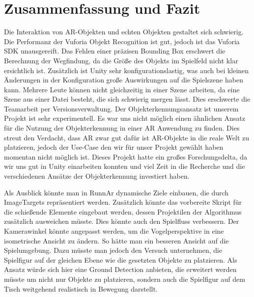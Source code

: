\chapter{Zusammenfassung und Fazit}

Die Interaktion von AR-Objekten und echten Objekten gestaltet sich schwierig. Die Performanz der Vuforia Objekt Recognition ist gut, jedoch ist das Vuforia SDK unausgereift. Das Fehlen einer präzisen Bounding Box erschwert die Berechnung der Wegfindung, da die Größe des Objekts im Spielfeld nicht klar ersichtlich ist. Zusätzlich ist Unity sehr konfigurationslastig, was auch bei kleinen Änderungen in der Konfiguration große Auswirkungen auf die Spielszene haben kann.  Mehrere Leute können nicht gleichzeitig in einer Szene arbeiten, da eine Szene aus einer Datei besteht, die sich schwierig mergen lässt. Dies erschwerte die Teamarbeit per Versionsverwaltung. Der Objekterkennungsansatz ist unserem Projekt ist sehr experimentell. Es war uns nicht möglich einen ähnlichen Ansatz für die Nutzung der Objekterkennung in einer AR Anwendung zu finden. Dies streut den Verdacht, dass AR zwar gut dafür ist AR-Objekte in die reale Welt zu platzieren, jedoch der Use-Case den wir für unser Projekt gewählt haben momentan nicht möglich ist. Dieses Projekt hatte ein großes Forschungsdelta, da wir uns gut in Unity einarbeiten konnten und viel Zeit in die Recherche und die verschiedenen Ansätze der Objekterkennung investiert haben. 


Als Ausblick könnte man in RunnAr dynamische Ziele einbauen, die durch ImageTargets repräsentiert werden. Zusätzlich könnte das vorbereite Skript für die schießende Elemente eingebaut werden, dessen Projektilen der Algorithmus zusätzlich ausweichen müsste. Dies könnte auch den Spielfluss verbessern. Der Kamerawinkel könnte angepasst werden, um die Vogelperspektive in eine isometrische Ansicht zu ändern. So hätte man ein besseren Ansicht auf die Spielumgebung. Dazu müsste man jedoch den Versuch unternehmen, die Spielfigur auf der gleichen Ebene wie die gesetzten Objekte zu platzieren. Als Ansatz würde sich hier eine Ground Detection anbieten, die erweitert werden müsste um nicht nur Objekte zu platzieren, sondern auch die Spielfigur auf dem Tisch weitgehend realistisch in Bewegung darstellt.